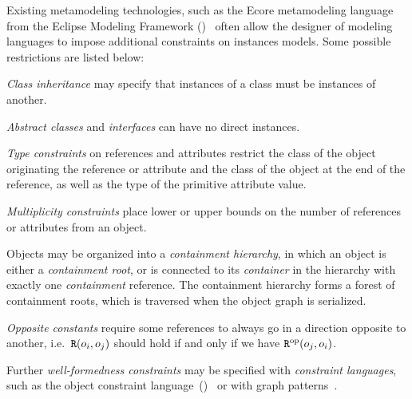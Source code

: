 Existing metamodeling technologies, such as the Ecore metamodeling language from the Eclipse Modeling Framework ()~\citep{Steinberg09emf} often allow the designer of modeling languages to impose additional constraints on instances models. Some possible restrictions are listed below: 
\begin{itemize*}
\item \emph{Class inheritance} may specify that instances of a class must be instances of another.
\item \emph{Abstract classes} and \emph{interfaces} can have no direct instances.
\item \emph{Type constraints} on references and attributes restrict the class of the object originating the reference or attribute and the class of the object at the end of the reference, as well as the type of the primitive attribute value.
\item \emph{Multiplicity constraints} place lower or upper bounds on the number of references or attributes from an object.
\item Objects may be organized into a \emph{containment hierarchy}, in which an object is either a \emph{containment root}, or is connected to its \emph{container} in the hierarchy with exactly one \emph{containment} reference. The containment hierarchy forms a forest of containment roots, which is traversed when the object graph is serialized.
\item \emph{Opposite constants} require some references to always go in a direction opposite to another, i.e.~\(\texttt{\upshape R}(o_i, o_j)\) should hold if and only if we have \(\texttt{\upshape R}^{\textrm{op}}(o_j, o_i)\).
\end{itemize*}

Further \emph{well-formedness constraints} may be specified with \emph{constraint languages}, such as the object constraint language~()~\citep{OMG14ocl} or with graph patterns~\citep{Bergmann11validation}.


